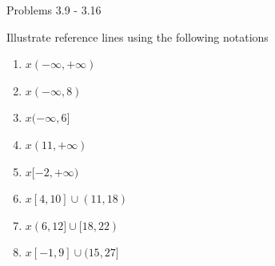 \documentclass[14pt,aspectratio=169]{beamer}
\begin{document}
\begin{frame}{Problems 3.9 - 3.16}
 \begin{exampleblock}{Illustrate reference lines using the following notations}
  \begin{enumerate}
   \item $x(-\infty, +\infty)$
   \item $x(-\infty, 8)$
   \item $x(-\infty, 6]$
   \item $x(11, +\infty)$
   \item $x[-2,+\infty)$
   \item $x[4, 10] \cup (11,18)$
   \item $x(6, 12]\cup [18,22)$
   \item $x[-1, 9]\cup (15,27]$
  \end{enumerate}

 \end{exampleblock}

\end{frame}
\end{document}
